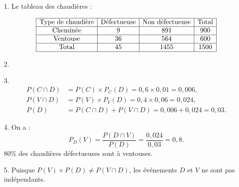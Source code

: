 1. Le tableau des chaudières :
	
	\[
\begin{array}{|c|c|c|c|}
	\hline
	\text{Type de chaudière} & \text{Défectueuse} & \text{Non défectueuse} & \text{Total} \\
	\hline
	\text{Cheminée} & 9 & 891 & 900 \\
		\hline
		\text{Ventouse} & 36 & 564 & 600 \\
	\hline
	\text{Total} & 45 & 1455 & 1500 \\
	\hline
\end{array}
	\]
	
	2. \begin{center}
	\end{center}
	3.
	\[
	\begin{aligned}
		P(C \cap D) &= P(C) \times P_C(D) = 0,6 \times 0,01 = 0,006, \\
		P(V \cap D) &= P(V) \times P_V(D) = 0,4 \times 0,06 = 0,024, \\
		P(D) &= P(C \cap D) + P(V \cap D) = 0,006 + 0,024 = 0,03.
	\end{aligned}
	\]
	
	4. On a :
	\[
	P_D(V) = \dfrac{P(D \cap V)}{P(D)} = \dfrac{0,024}{0,03} = 0,8.
	\]
	80\% des chaudières défectueuses sont à ventouses.
	
	5. Puisque $P(V) \times P(D) \neq P(V \cap D)$, les événements $D$ et $V$ ne sont pas indépendants.
